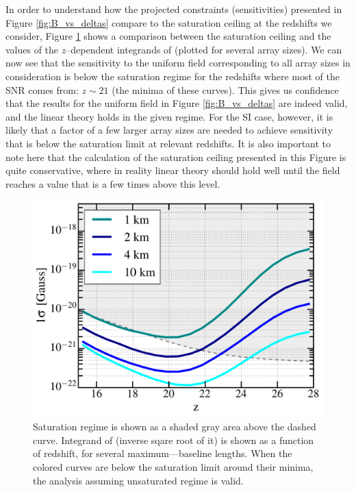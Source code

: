 In order to understand how the projected constraints (sensitivities) presented in Figure \ref{fig:B_vs_deltas} compare to the saturation ceiling at the redshifts we consider, Figure \ref{fig:Bsat} shows a comparison between the saturation ceiling and the values of the $z$--dependent integrands of \eq{\ref{eq:fisher_patch}} (plotted for several array sizes). We can now see that the sensitivity to the uniform field corresponding to all array sizes in consideration is below the saturation regime for the redshifts where most of the SNR comes from: $z\sim21$ (the minima of these curves). This gives us confidence that the results for the uniform field in Figure \ref{fig:B_vs_deltas} are indeed valid, and the linear theory holds in the given regime. For the SI case, however, it is likely that a factor of a few larger array sizes are needed to achieve sensitivity that is below the saturation limit at relevant redshifts. It is also important to note here that the calculation of the saturation ceiling presented in this Figure is quite conservative, where in reality  linear theory should hold well until the field reaches a value that is a few times above this level.
\begin{figure}
\centering
\includegraphics[width=.35\textwidth,keepaspectratio=true]{sigmaB0_vs_z.pdf}
\caption{Saturation regime is shown as a shaded gray area above the dashed curve. Integrand of \eq{\ref{eq:fisher_patch}} (inverse sqare root of it) is shown as a function of redshift, for several maximum---baseline lengths.  When the colored curves are below the saturation limit around their minima, the analysis assuming unsaturated regime is valid.\label{fig:Bsat}}
\end{figure}
